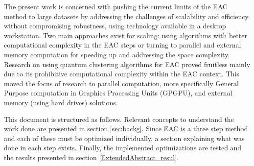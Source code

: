 The present work is concerned with pushing the current limits of the EAC method to large datasets by addressing the challenges of scalability and efficiency without compromising robustness, using technology available in a desktop workstation.
Two main approaches exist for scaling: using algorithms with better computational complexity in the EAC steps or turning to parallel and external memory computation for speeding up and addressing the space complexity.
Research on using quantum clustering algorithms \cite{Casper2012KMeans,Horn2001a} for EAC proved fruitless mainly due to its prohibitive computational complexity within the EAC context.
This moved the focus of research to parallel computation, more specifically General Purpose computation in Graphics Processing Units (GPGPU), and external memory (using hard drives) solutions.

This document is structured as follows.
Relevant concepts to understand the work done are presented in section \ref{sec:backg}.
Since EAC is a three step method and each of these must be optimized individually, a section explaining what was done in each step exists.
Finally, the implemented optimizations are tested and the results presented in section \ref{ExtendedAbstract_resul}.

